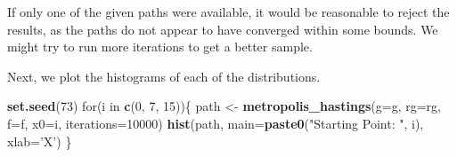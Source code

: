 \documentclass[]{article}
\newenvironment{Shaded}{\begin{snugshade}}{\end{snugshade}}
\newcommand{\KeywordTok}[1]{\textcolor[rgb]{0.13,0.29,0.53}{\textbf{{#1}}}}
\newcommand{\DataTypeTok}[1]{\textcolor[rgb]{0.13,0.29,0.53}{{#1}}}
\newcommand{\DecValTok}[1]{\textcolor[rgb]{0.00,0.00,0.81}{{#1}}}
\newcommand{\StringTok}[1]{\textcolor[rgb]{0.31,0.60,0.02}{{#1}}}
\newcommand{\NormalTok}[1]{{#1}}
\begin{document}
If only one of the given paths were available, it would be reasonable to
reject the results, as the paths do not appear to have converged within
some bounds. We might try to run more iterations to get a better sample.

Next, we plot the histograms of each of the distributions.

\begin{Shaded}
\begin{Highlighting}[]
\KeywordTok{set.seed}\NormalTok{(}\DecValTok{73}\NormalTok{)}
\NormalTok{for(i in }\KeywordTok{c}\NormalTok{(}\DecValTok{0}\NormalTok{, }\DecValTok{7}\NormalTok{, }\DecValTok{15}\NormalTok{))\{}
  \NormalTok{path <-}\StringTok{ }\KeywordTok{metropolis_hastings}\NormalTok{(}\DataTypeTok{g=}\NormalTok{g, }\DataTypeTok{rg=}\NormalTok{rg, }\DataTypeTok{f=}\NormalTok{f, }\DataTypeTok{x0=}\NormalTok{i, }\DataTypeTok{iterations=}\DecValTok{10000}\NormalTok{)}
  \KeywordTok{hist}\NormalTok{(path, }\DataTypeTok{main=}\KeywordTok{paste0}\NormalTok{(}\StringTok{"Starting Point: "}\NormalTok{, i), }\DataTypeTok{xlab=}\StringTok{'X'}\NormalTok{)}
\NormalTok{\}}
\end{Highlighting}
\end{Shaded}
\end{document}
